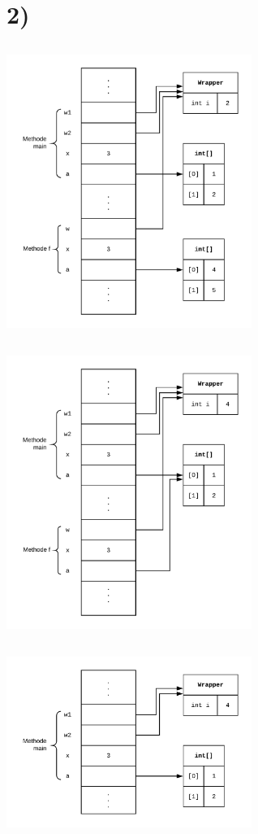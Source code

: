 \documentclass[12pt]{article}
\date{}
\begin{document}
\section{2)}
\subsection{}
\includegraphics[width=0.6\textwidth]{Speicherstand1.png}

\subsection{}
\includegraphics[width=0.6\textwidth]{Speicherstand2.png}

\subsection{}
\includegraphics[width=0.6\textwidth]{Speicherstand3.png}
\pagebreak
\end{document}
